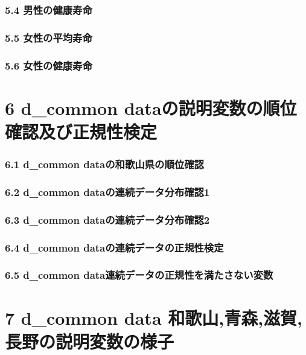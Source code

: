 \subsection{5.4 男性の健康寿命}


\subsection{5.5 女性の平均寿命}



\subsection{5.6 女性の健康寿命}







\chapter{6 d\_common dataの説明変数の順位確認及び正規性検定}



\subsection{6.1 d\_common dataの和歌山県の順位確認}

\subsection{6.2 d\_common dataの連続データ分布確認1}

\subsection{6.3 d\_common dataの連続データ分布確認2}

\subsection{6.4 d\_common dataの連続データの正規性検定}

\subsection{6.5 d\_common data連続データの正規性を満たさない変数}


\chapter{7 d\_common data 和歌山,青森,滋賀,長野の説明変数の様子}





